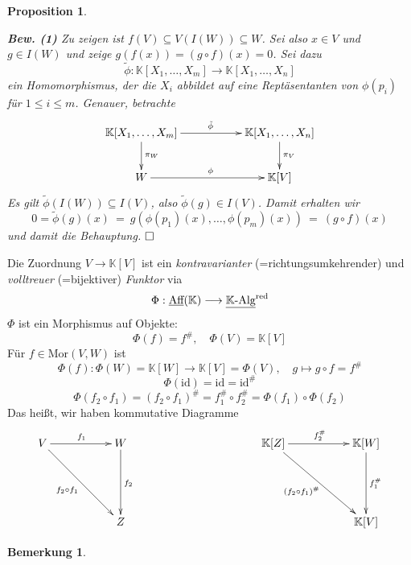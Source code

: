 \documentclass[11pt]{book}
\newtheorem{prop}[theorem]{Proposition}
\newtheorem{remark}[theorem]{Bemerkung}
\theoremstyle{nonumberbreak}
\newenvironment{pr}[1][]{\ifthenelse{\equal{#1}{}}{\proof}{\proof[#1]}\rm}{\endproof}
\newenvironment{folg}[1][]{\ifthenelse{\equal{#1}{}}{\folger}{\folger[#1]}\rm}{\endfolger}
\begin{document}
\begin{spacing}{1.3}
\begin{prop}
\begin{pr}
\begin{compactenum}
\begin{compactenum}
\begin{compactenum}
\item[\textbf{Bew. (1)}] Zu zeigen ist $f(V) \subseteq V(I(W)) \subseteq W$. Sei also $x \in V$ und $g \in I(W)$ und zeige $g(f(x)) = (g \circ f)(x)=0$. Sei dazu
$$\tilde{\phi}: \mathbb{K}[X_1, \ldots, X_m] \longrightarrow \mathbb{K}[X_1, \ldots, X_n]$$
ein Homomorphismus, der die $X_i$ abbildet auf eine Reptäsentanten von $\phi(p_i)$ für $1 \leqslant i \leqslant m$. Genauer, betrachte
$$
\begin{xy}
\xymatrix{
\mathbb{K}[X_1, \ldots, X_m] \ar[rr]^{\tilde{\phi}} \ar[d]^{\pi_W} && \mathbb{K}[X_1, \ldots, X_n] \ar[d]^{\pi_V} \\ W \ar[rr]^{\phi} && \mathbb{K}[V] 
}
\end{xy}
$$
Es gilt $\tilde{\phi}(I(W)) \subseteq I(V)$, also $\tilde{\phi}(g) \in I(V)$. Damit erhalten wir
$$0=\tilde{\phi}(g)(x)\ =\ g\left( \phi(p_1)(x), \ldots, \phi(p_m)(x) \right)\ =\ (g \circ f)(x)$$
und damit die Behauptung. $\hfill \Box$
\end{compactenum}
\end{compactenum}
\end{compactenum}
\end{pr}
\end{prop}


\begin{folg} %
Die Zuordnung $V \longrightarrow \mathbb{K}[V]$ ist ein \textit{kontravarianter} (=richtungsumkehrender) und \textit{volltreuer} (=bijektiver) \textit{Funktor} via
$$\Phi: \textrm{\underline{Aff}}(\mathbb{K}) \longrightarrow \underline{ \mathbb{K}\textrm{-Alg}}^{\textrm{red}}$$
$\Phi$ ist ein Morphismus auf Objekte:
$$\Phi(f)=f^\#, \quad \Phi(V)=\mathbb{K}[V]$$
Für $f \in \textrm{Mor}(V,W) $ ist
$$\Phi(f): \Phi(W)=\mathbb{K}[W] \longrightarrow \mathbb{K}[V]=\Phi(V), \quad g \mapsto g \circ f=f^\#$$
$$\Phi(\textrm{id})=\textrm{id}=\textrm{id}^\#$$
$$\Phi(f_2 \circ f_1)=\left(f_2 \circ f_1\right)^\#=f_1^\# \circ f_2^\#=\Phi(f_1) \circ \Phi(f_2)$$
Das heißt, wir haben kommutative Diagramme\\[-10pt]
$$
\begin{xy}
\xymatrix{
V \ar[rr]^{f_1} \ar[rrdd]_{f_2 \circ f_1} && W \ar[dd]^{f_2} &&&& \mathbb{K}[Z] \ar[rrdd]_{(f_2\circ f_1)^\#} \ar[rr]^{f_2^\#} && \mathbb{K}[W] \ar[dd]^{f_1^\#} \\ &&&&&&&& \\ && Z &&&&&& \mathbb{K}[V]
}
\end{xy}
$$
\end{folg}

\begin{remark} %


\end{remark}
\end{spacing}
\end{document}
